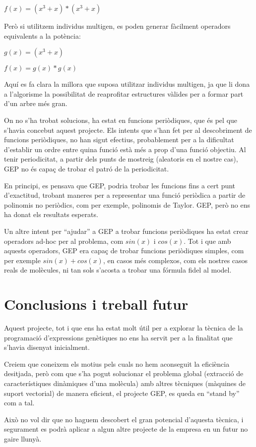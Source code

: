 \begin{center}
	$f(x) = (x^3 + x) * (x^3 + x) $
\end{center}


Però si utilitzem individus multigen, es poden generar fàcilment operadors equivalents a la
potència:

\begin{center}
	$g(x) = (x^3 + x)$

	$f(x) = g(x) * g(x)$
\end{center}

Aquí es fa clara la millora que suposa utilitzar individus multigen, ja que li
dona a l'algorisme la possibilitat de reaprofitar estructures vàlides per a
formar part d'un arbre més gran.

On no s'ha trobat solucions, ha estat en funcions periòdiques, que és pel que
s'havia concebut aquest projecte.  Els intents que s'han fet per al descobriment
de funcions periòdiques, no han sigut efectius, probablement per a la dificultat
d'establir un ordre entre quina funció està més a prop d'una funció objectiu.
Al tenir periodicitat, a partir dels punts de mostreig (aleatoris en el nostre
cas), GEP no és capaç de trobar el patró de la periodicitat.

En principi, es pensava que GEP, podria trobar les funcions fins a cert punt
d'exactitud, trobant maneres per a representar una funció periòdica a partir de
polinomis no periòdics, com per exemple, polinomis de Taylor. GEP, però no ens
ha donat els resultats esperats.

Un altre intent per ``ajudar'' a GEP a trobar funcions periòdiques ha estat
crear operadors ad-hoc per al problema, com $sin(x)$ i $cos(x)$.  Tot i que amb
aquests operadors, GEP era capaç de trobar funcions periòdiques simples, com per
exemple $sin(x)+cos(x)$, en casos més complexos, com els nostres casos reals de
molècules, ni tan sols s'acosta a trobar una fórmula fidel al model.

\section{Conclusions i treball futur} %
\label{sec:GConclusions i treball futur}
Aquest projecte, tot i que ens ha estat molt útil per a explorar la tècnica de
la programació d'expressions genètiques no ens ha servit per a la finalitat que
s'havia disenyat inicialment.

Creiem que coneixem els motius pels cuals no hem aconseguit la eficiència
desitjada, però com que s'ha pogut solucionar el problema global (extracció de
característiques dinàmiques d'una molècula) amb altres tècniques (màquines de
suport vectorial) de manera eficient, el projecte GEP, es queda en ``stand by''
com a tal.

Això no vol dir que no haguem descobert el gran potencial d'aquesta tècnica, i
segurament es podrà aplicar a algun altre projecte de la empresa en un futur no
gaire llunyà.

%
